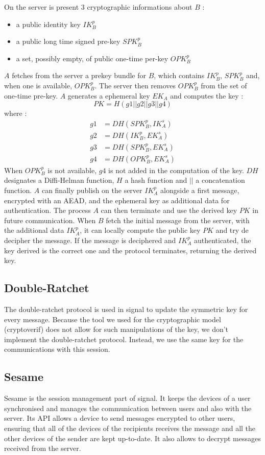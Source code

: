\documentclass[a4paper, 10pt]{article}
\begin{document}
		On the server is present 3 cryptographic informations about $B$ :
		\begin{itemize}
			\item a public identity key $IK_B^p$
			\item a public long time signed pre-key $SPK_B^p$
			\item a set, possibly empty, of public one-time per-key $OPK_B^p$
		\end{itemize}
		$A$ fetches from the server a prekey bundle for $B$, which contains $IK_B^p$, $SPK_B^p$ and, when one is available, $OPK_B^p$. The server then removes $OPK_B^p$ from the set of one-time pre-key.
		$A$ generates a ephemeral key $EK_A$ and computes the key :
		\[
			PK = H(g1 || g2 || g3 || g4)
		\]
		where :
		\begin{align*}
			g1 &= DH(SPK_B^p, IK_A^s) \\
			g2 &= DH(IK_B^p, EK_A^s) \\
			g3 &= DH(SPK_B^p, EK_A^s) \\
			g4 &= DH(OPK_B^p, EK_A^s)
		\end{align*}
		When $OPK_B^p$ is not available, $g4$ is not added in the computation of the key. $DH$ designates a Diffi-Helman function, $H$ a hash function and $||$ a concatenation function.
		$A$ can finally publish on the server $IK_A^p$ alongside a first message, encrypted with an AEAD, and the ephemeral key as additional data for authentication. The process $A$ can then terminate and use the derived key $PK$ in future communication.
		When $B$ fetch the initial message from the server, with the additional data $IK_A^p$, it can locally compute the public key $PK$ and try de decipher the message. If the message is deciphered and $IK_A^p$ authenticated, the key derived is the correct one and the protocol terminates, returning the derived key.

	\subsection{Double-Ratchet}
		The double-ratchet protocol is used in signal to update the symmetric key for every message. Because the tool we used for the cryptographic model (cryptoverif) does not allow for such manipulations of the key, we don't implement the double-ratchet protocol. Instead, we use the same key for the communications with this session.

	\subsection{Sesame}
		Sesame is the session management part of signal. It keeps the devices of a user synchronised and manages the communication between users and also with the server. Its API allows a device to send messages encrypted to other users, ensuring that all of the devices of the recipients receives the message and all the other devices of the sender are kept up-to-date. It also allows to decrypt messages received from the server.
\end{document}
